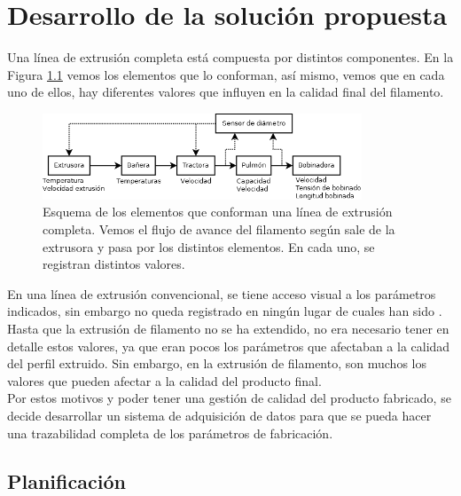 \chapter{Desarrollo de la solución propuesta}
\label{cap:descrip}

Una línea de extrusión completa está compuesta por distintos componentes. En la Figura \ref{fig:esquema_extrusora} vemos los elementos que lo conforman, así mismo, vemos que en cada uno de ellos, hay diferentes valores que influyen en la calidad final del filamento.\\

\begin{figure}[H]
    \centering
    \includegraphics[width=0.85\textwidth]{images/esquema_extrusion.png}
    \caption[Esquema de los elementos que conforman una extrusora.]{Esquema de los elementos que conforman una línea de extrusión completa. Vemos el flujo de avance del filamento según sale de la extrusora y pasa por los distintos elementos. En cada uno, se registran distintos valores.}
    \label{fig:esquema_extrusora}
\end{figure}

En una línea de extrusión convencional, se tiene acceso visual a los parámetros indicados, sin embargo no queda registrado en ningún lugar de cuales han sido . Hasta que la extrusión de filamento no se ha extendido, no era necesario tener en detalle estos valores, ya que eran pocos los parámetros que afectaban a la calidad del perfil extruido. Sin embargo, en la extrusión de filamento, son muchos los valores que pueden afectar a la calidad del producto final.\\

Por estos motivos y poder tener una gestión de calidad del producto fabricado, se decide desarrollar un sistema de adquisición de datos para que se pueda hacer una trazabilidad completa de los parámetros de fabricación.\\

\section{Planificación}
\label{sec:planificacion}


